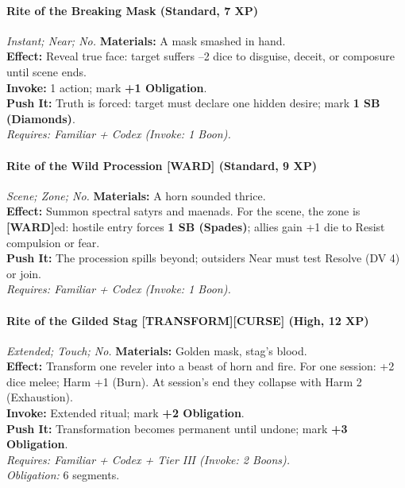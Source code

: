 \paragraph*{Rite of the Breaking Mask (Standard, 7 XP)} \emph{Instant; Near; No.}
\textbf{Materials:} A mask smashed in hand.\\
\textbf{Effect:} Reveal true face: target suffers --2 dice to disguise, deceit, or composure until scene ends.\\
\textbf{Invoke:} 1 action; mark \textbf{+1 Obligation}.\\
\textbf{Push It:} Truth is forced: target must declare one hidden desire; mark \textbf{1 SB (Diamonds)}.\\
\emph{Requires: Familiar + Codex (\textit{Invoke:} 1 Boon).}

\paragraph*{Rite of the Wild Procession [WARD] (Standard, 9 XP)} \emph{Scene; Zone; No.}
\textbf{Materials:} A horn sounded thrice.\\
\textbf{Effect:} Summon spectral satyrs and maenads. For the scene, the zone is \textbf{[WARD]}ed: hostile entry forces \textbf{1 SB (Spades)}; allies gain +1 die to Resist compulsion or fear.\\
\textbf{Push It:} The procession spills beyond; outsiders Near must test Resolve (DV 4) or join.\\
\emph{Requires: Familiar + Codex (\textit{Invoke:} 1 Boon).}

\paragraph*{Rite of the Gilded Stag [TRANSFORM][CURSE] (High, 12 XP)} \emph{Extended; Touch; No.}
\textbf{Materials:} Golden mask, stag’s blood.\\
\textbf{Effect:} Transform one reveler into a beast of horn and fire. For one session: +2 dice melee; Harm +1 (Burn). At session’s end they collapse with Harm 2 (Exhaustion).\\
\textbf{Invoke:} Extended ritual; mark \textbf{+2 Obligation}.\\
\textbf{Push It:} Transformation becomes permanent until undone; mark \textbf{+3 Obligation}.\\
\emph{Requires: Familiar + Codex + Tier III (\textit{Invoke:} 2 Boons).}\\
\emph{Obligation:} 6 segments.

